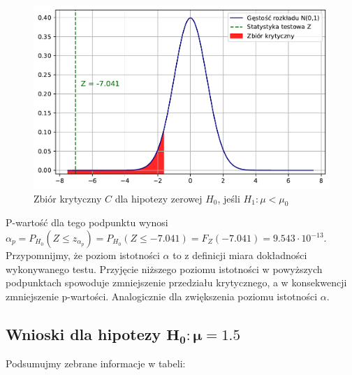 \documentclass[12pt]{mwart}
\begin{document}
	\begin{figure}[H]
	\begin{center}
		\includegraphics[scale=0.6]{krytyczny3.pdf}
		\caption{Zbiór krytyczny $C$ dla hipotezy zerowej $H_0$, jeśli $H_1 \colon \mu < \mu_0$}
	\end{center}
	\end{figure}
	
\noindent P-wartość dla tego podpunktu wynosi $\alpha_p = P_{H_0}(Z\leq z_{\alpha_p}) = P_{H_0}(Z \leq -7.041) = F_Z(-7.041) = 9.543 \cdot 10^{-13}$. \\

\noindent Przypomnijmy, że poziom istotności $\alpha$ to z definicji miara dokładności wykonywanego testu. Przyjęcie niższego poziomu istotności w powyższych podpunktach spowoduje zmniejszenie przedziału krytycznego, a w konsekwencji zmniejszenie p-wartości. Analogicznie dla zwiększenia poziomu istotności $\alpha$.



	\subsection{Wnioski dla hipotezy $\bm{H_0 \colon \mu = 1.5}$}
	\noindent Podsumujmy zebrane informacje w tabeli:
	
	\begin{table}[H]
    \centering
\end{table}
\end{document}
